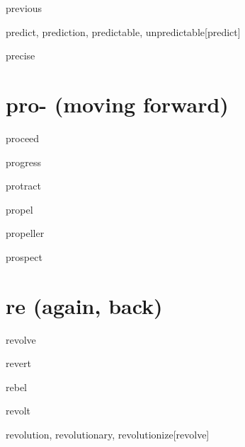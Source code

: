 \begin{wordRef}{previous}
\end{wordRef}

\begin{wordRef}{predict, prediction, predictable, unpredictable}[predict]
\end{wordRef}

\begin{wordRef}{precise}
\end{wordRef}

\section{pro- (moving forward)}

\begin{wordRef}{proceed}
\end{wordRef}

\begin{wordRef}{progress}
\end{wordRef}

\begin{wordRef}{protract}
\end{wordRef}

\begin{wordRef}{propel}
\end{wordRef}

\begin{wordRef}{propeller}
\end{wordRef}

\begin{wordRef}{prospect}
\end{wordRef}

\section{re (again, back)}

\begin{wordRef}{revolve}
\end{wordRef}

\begin{wordRef}{revert}
\end{wordRef}

\begin{wordRef}{rebel}
\end{wordRef}

\begin{wordRef}{revolt}
\end{wordRef}

\begin{wordRef}{revolution, revolutionary, revolutionize}[revolve]
\end{wordRef}

